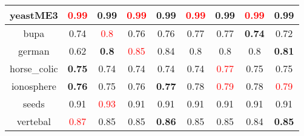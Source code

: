 \documentclass{article}%
\begin{document}
\begin{tabular}{c|cccccccc}
\hline%
yeastME3&\textcolor{red}{ 
0.99
}&0.99&\textcolor{red}{ 
0.99
}&0.99&\textcolor{red}{ 
0.99
}&0.99&\textcolor{red}{ 
0.99
}&0.99\\%
\hline%
bupa&0.74&\textcolor{red}{ 
0.8
}&0.76&0.76&0.77&0.77&\textbf{0.74}&0.72\\%
\hline%
german&0.62&\textbf{0.8}&\textcolor{red}{ 
0.85
}&0.84&0.8&0.8&0.8&\textbf{0.81}\\%
\hline%
horse\_colic&\textbf{0.75}&0.74&0.74&0.74&0.74&\textcolor{red}{ 
0.77
}&0.75&0.75\\%
\hline%
ionosphere&\textbf{0.76}&0.75&0.76&\textbf{0.77}&0.78&\textcolor{red}{ 
0.79
}&0.78&\textcolor{red}{ 
0.79
}\\%
\hline%
seeds&0.91&\textcolor{red}{ 
0.93
}&0.91&0.91&0.91&0.91&0.91&0.91\\%
\hline%
vertebal&\textcolor{red}{ 
0.87
}&0.85&0.85&\textbf{0.86}&0.85&0.85&0.84&\textbf{0.85}\\%
\hline%
\end{tabular}

%
\end{document}
